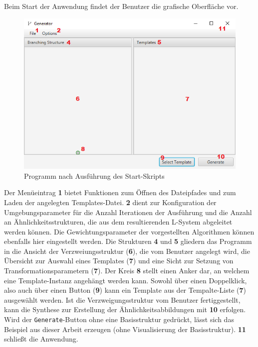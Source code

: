 Beim Start der Anwendung findet der Benutzer die grafische Oberfläche vor.
\begin{figure}[H]
    \centering
    \includegraphics[width=14cm]{../images/UI_numbers1.png}
    \caption{Programm nach Ausführung des Start-Skripts}
\end{figure}
Der Menüeintrag \textbf{1} bietet Funktionen zum Öffnen des Dateipfades und zum Laden der angelegten Templates-Datei.
\textbf{2} dient zur Konfiguration der Umgebungsparameter für die Anzahl Iterationen der Ausführung
und die Anzahl an Ähnlichkeitsstrukturen, die aus dem resultierenden L-System abgeleitet werden können.
Die Gewichtungsparameter der vorgestellten Algorithmen können ebenfalls hier eingestellt werden.
Die Strukturen \textbf{4} und \textbf{5} gliedern das Programm in die Ansicht der Verzweiungsstruktur (\textbf{6}), die vom Benutzer
angelegt wird, die Übersicht zur Auswahl eines Templates (\textbf{7}) und eine Sicht zur Setzung von Transformationsparametern (\textbf{7}).
Der Kreis \textbf{8} stellt einen Anker dar, an welchem eine Template-Instanz angehängt werden kann.
Sowohl über einen Doppelklick, also auch über einen Button (\textbf{9}) kann ein Template aus der Tempalte-Liste (\textbf{7})
ausgewählt werden.
Ist die Verzweigungsstruktur vom Benutzer fertiggestellt, kann die Synthese zur Erstellung der Ähnlichkeitsabbildungen
mit \textbf{10} erfolgen.
Wird der \texttt{Generate}-Button ohne eine Basisstruktur gedrückt, lässt sich das Beispiel aus
dieser Arbeit erzeugen (ohne Visualisierung der Basisstruktur).
\textbf{11} schließt die Anwendung.


